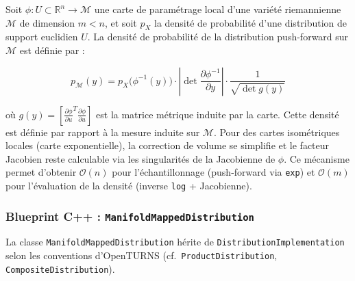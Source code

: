 \documentclass[11pt,a4paper]{article}
\begin{document}
Soit $\phi : U \subset \mathbb{R}^{n} \to \mathcal{M}$ une carte de paramétrage local d'une variété riemannienne $\mathcal{M}$ de dimension $m < n$, et soit $p_X$ la densité de probabilité d'une distribution de support euclidien $U$. La densité de probabilité de la distribution push-forward sur $\mathcal{M}$ est définie par :

\begin{equation}
p_{\mathcal{M}}(y) = p_X\bigl(\phi^{-1}(y)\bigr) \cdot \left| \det \frac{\partial \phi^{-1}}{\partial y} \right| \cdot \frac{1}{\sqrt{\det g(y)}}
\label{eq:pushforward}
\end{equation}

où $g(y) = \left[ \frac{\partial \phi}{\partial u}^T \frac{\partial \phi}{\partial u} \right]$ est la matrice métrique induite par la carte. Cette densité est définie par rapport à la mesure induite sur $\mathcal{M}$. Pour des cartes isométriques locales (carte exponentielle), la correction de volume se simplifie et le facteur Jacobien reste calculable via les singularités de la Jacobienne de $\phi$. Ce mécanisme permet d'obtenir $\mathcal{O}(n)$ pour l'échantillonnage (push-forward via \texttt{exp}) et $\mathcal{O}(m)$ pour l'évaluation de la densité (inverse \texttt{log} + Jacobienne).

\subsubsection{Blueprint C++ : \texttt{ManifoldMappedDistribution}}

La classe \texttt{ManifoldMappedDistribution} hérite de \texttt{DistributionImplementation} selon les conventions d'OpenTURNS (cf.\ \texttt{ProductDistribution}, \texttt{CompositeDistribution}).
\end{document}
